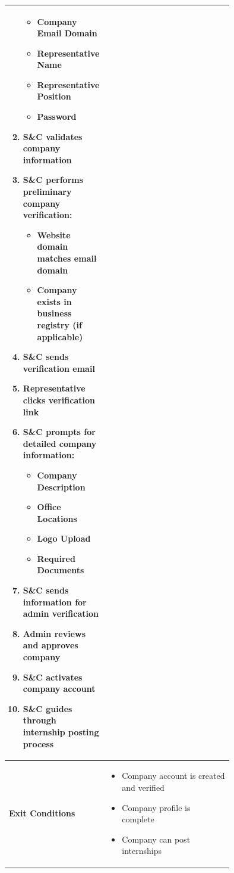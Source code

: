 \begin{center}
\begin{longtable}{|l|p{0.75\linewidth}|}
\begin{enumerate}
\begin{itemize}
                \item Company Email Domain
                \item Representative Name
                \item Representative Position
                \item Password
            \end{itemize}
            \item S\&C validates company information
            \item S\&C performs preliminary company verification:
            \begin{itemize}
                \item Website domain matches email domain
                \item Company exists in business registry (if applicable)
            \end{itemize}
            \item S\&C sends verification email
            \item Representative clicks verification link
            \item S\&C prompts for detailed company information:
            \begin{itemize}
                \item Company Description
                \item Office Locations
                \item Logo Upload
                \item Required Documents
            \end{itemize}
            \item S\&C sends information for admin verification
            \item Admin reviews and approves company
            \item S\&C activates company account
            \item S\&C guides through internship posting process
        \end{enumerate} \\
        \hline
        \textbf{Exit Conditions}   & 
        \begin{itemize}
            \item Company account is created and verified
            \item Company profile is complete
            \item Company can post internships
        \end{itemize} \\

\end{longtable}
\end{center}
